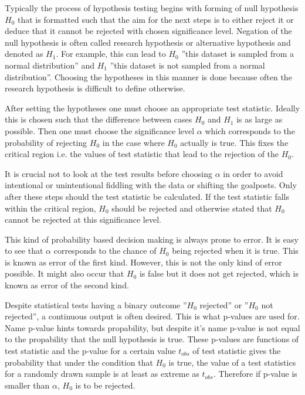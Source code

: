 \documentclass[english, oneside]{HYgradu}
\begin{document}
Typically the process of hypothesis testing begins with forming of null hypothesis $H_0$ that is formatted such that the aim for the next steps is to either reject it or deduce that it cannot be rejected with chosen significance level. Negation of the null hypothesis is often called research hypothesis or alternative hypothesis and denoted as $H_1$. For example, this can lead to $H_0$ ''this dataset is sampled from a normal distribution'' and $H_1$ ''this dataset is not sampled from a normal distribution''. Choosing the hypotheses in this manner is done because often the research hypothesis is difficult to define otherwise. \cite{bohm2010introduction, wall2003practical}

After setting the hypotheses one must choose an appropriate test statistic. Ideally this is chosen such that the difference between cases $H_0$ and $H_1$ is as large as possible. Then one must choose 
the significance level $\alpha$ which corresponds to the probability of rejecting $H_0$ in the case where $H_0$ actually is true. This fixes the critical region i.e. the values of test statistic that lead to the rejection of the $H_0$. \cite{bohm2010introduction, wall2003practical}

It is crucial not to look at the test results before choosing $\alpha$ in order to avoid intentional or unintentional fiddling with the data or shifting the goalposts. Only after these steps should the test statistic be calculated. If the test statistic falls within the critical region, $H_0$ should be rejected and otherwise stated that $H_0$ cannot be rejected at this significance level. \cite{bohm2010introduction, wall2003practical}

This kind of probability based decision making is always prone to error. It is easy to see that $\alpha$ corresponds to the chance of $H_0$ being rejected when it is true. This is known as error of the first kind. However, this is not the only kind of error possible. It might also occur that $H_0$ is false but it does not get rejected, which is known as error of the second kind. \cite{bohm2010introduction}

Despite statistical tests having a binary outcome ''$H_0$ rejected'' or ''$H_0$ not rejected'', a continuous output is often desired. This is what p-values are used for. Name p-value hints towards propability, but despite it's name p-value is not equal to the propability that the null hypothesis is true. These p-values are functions of test statistic and the p-value for a certain value $t_{obs}$ of test statistic gives the probability that under the condition that $H_0$ is true, the value of a test statistics for a randomly drawn sample is at least as extreme as $t_{obs}$. Therefore if p-value is smaller than $\alpha$, $H_0$ is to be rejected. \cite{bohm2010introduction}
\end{document}
